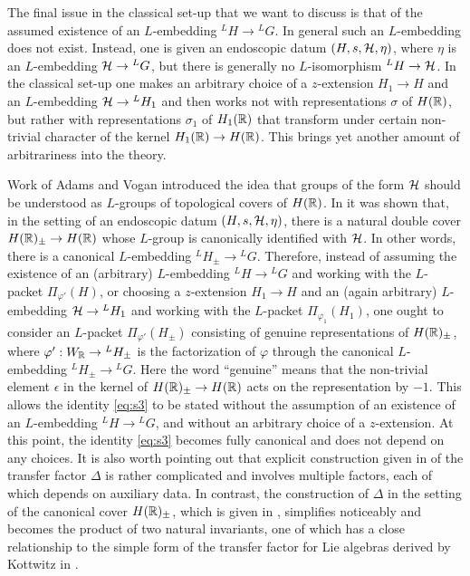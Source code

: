 \documentclass{article}
\theoremstyle{definition}
\numberwithin{equation}{section}
\renewcommand{\-}{\hyp{}}
\begin{document}
The final issue in the classical set-up that we want to discuss is that of the assumed existence of an $L$\-embedding $^LH \to {^LG}$. In general such an $L$\-embedding does not exist. Instead, one is given an endoscopic datum $(H,s,\mathcal{H},\eta)$, where $\eta$ is an $L$\-embedding $\mathcal{H} \to {^LG}$, but there is generally no $L$\-isomorphism $^LH \to \mathcal{H}$. In the classical set-up one makes an arbitrary choice of a $z$-extension $H_1 \to H$ and an $L$\-embedding $\mathcal{H} \to {^LH_1}$ and then works not with representations $\sigma$ of $H(\mathbb{R})$, but rather with representations $\sigma_1$ of $H_1(\mathbb{R})$ that transform under certain non-trivial character of the kernel $H_1(\mathbb{R}) \to H(\mathbb{R})$. This brings yet another amount of arbitrariness into the theory.

Work of Adams and Vogan \cite{AV92} introduced the idea that groups of the form $\mathcal{H}$ should be understood as $L$\-groups of topological covers of $H(\mathbb{R})$. In \cite{KalHDC} it was shown that, in the setting of an endoscopic datum $(H,s,\mathcal{H},\eta)$, there is a natural double cover $H(\mathbb{R})_\pm \to H(\mathbb{R})$ whose $L$\-group is canonically identified with $\mathcal{H}$. In other words, there is a canonical $L$\-embedding $^LH_\pm \to {^LG}$. Therefore, instead of assuming the existence of an  (arbitrary) $L$\-embedding $^LH \to {^LG}$ and working with the $L$\-packet $\Pi_{\varphi'}(H)$, or choosing a $z$-extension $H_1 \to H$ and an (again arbitrary) $L$\-embedding $\mathcal{H} \to {^LH_1}$ and working with the $L$\-packet $\Pi_{\varphi_1}(H_1)$, one ought to consider an $L$\-packet $\Pi_{\varphi'}(H_\pm)$ consisting of genuine representations of $H(\mathbb{R})_\pm$, where $\varphi' : W_{\mathbb{R}} \to {^LH_\pm}$ is the factorization of $\varphi$ through the canonical $L$\-embedding $^LH_\pm \to {^LG}$. Here the word ``genuine'' means that the non-trivial element $\epsilon$ in the kernel of $H(\mathbb{R})_\pm \to H(\mathbb{R})$ acts on the representation by $-1$. This allows the identity \eqref{eq:s3} to be stated without the assumption of an existence of an $L$\-embedding $^LH \to {^LG}$, and without an arbitrary choice of a $z$-extension. At this point, the identity \eqref{eq:s3} becomes fully canonical and does not depend on any choices. It is also worth pointing out that explicit construction given in \cite{LS87} of the transfer factor $\Delta$ is rather complicated and involves multiple factors, each of which depends on auxiliary data. In contrast, the construction of $\Delta$ in the setting of the canonical cover $H(\mathbb{R})_\pm$, which is given in \cite[\S4.3]{KalHDC}, simplifies noticeably and becomes the product of two natural invariants, one of which has a close relationship to the simple form of the transfer factor for Lie algebras derived by Kottwitz in \cite{Kot99}.
\end{document}
